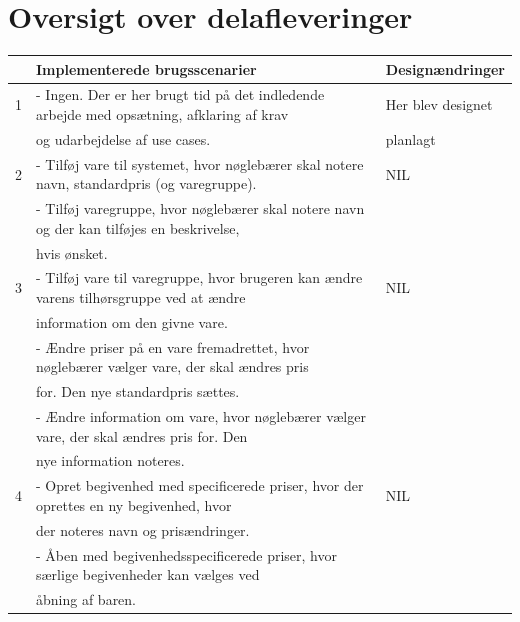 \documentclass[]{article}
\begin{document}
\pagebreak[3]



\newpage  %


\appendix

\section{Oversigt over delafleveringer}
\begin{table}[!h]
\centering
\begin{tabular}{|l|l|l|} \hline
& \textbf{Implementerede brugsscenarier} & \textbf{Designændringer}  \\ \hline
1 & - Ingen. Der er her brugt tid på det indledende arbejde med opsætning, afklaring af krav & Her blev designet  \\
  & og udarbejdelse af use cases. & planlagt \\ \hline
2 &	- Tilføj vare til systemet, hvor nøglebærer skal notere navn, standardpris (og varegruppe).& NIL \\
  & - Tilføj varegruppe, hvor nøglebærer skal notere navn og der kan tilføjes en beskrivelse, & \\
  & hvis ønsket. &  \\ \hline
3 & - Tilføj vare til varegruppe, hvor brugeren kan ændre varens tilhørsgruppe ved at ændre & NIL \\
  & information om den givne vare. & \\
  & - Ændre priser på en vare fremadrettet, hvor nøglebærer vælger vare, der skal ændres pris & \\
  & for. Den nye standardpris sættes. & \\
  & - Ændre information om vare, hvor nøglebærer vælger vare, der skal ændres pris for. Den & \\ 
  & nye information noteres. & \\ \hline
4 & - Opret begivenhed med specificerede priser, hvor der oprettes en ny begivenhed, hvor & NIL \\
  & der noteres navn og prisændringer. & \\
  & - Åben med begivenhedsspecificerede priser, hvor 
  særlige begivenheder kan vælges ved & \\
  & åbning af baren. & \\

\end{tabular}
\end{table}
\end{document}
